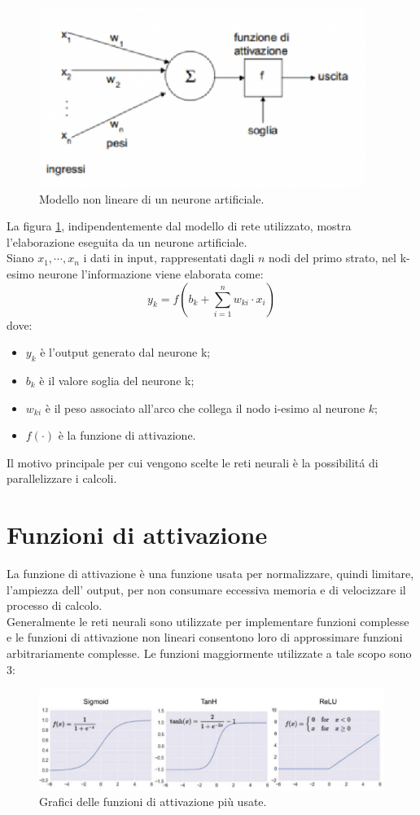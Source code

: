 \documentclass[a4paper,12pt]{report}
\begin{document}
\begin{figure}[!h]
\centering
\includegraphics[scale=1.8]{reteneurale.eps}
\caption{Modello non lineare di un neurone artificiale.}
\label{neurone}
\end{figure}

La figura \ref{neurone}, indipendentemente dal modello di rete utilizzato, mostra l'elaborazione eseguita da un neurone artificiale.\\
Siano $x_1,\cdots,x_n$ i dati in input, rappresentati dagli $n$ nodi del primo strato, nel k-esimo neurone l'informazione viene elaborata come:
$$y_k=f(b_k+\sum_{i=1}^n w_{ki}\cdot x_i)$$
dove:\\
\begin{itemize}
\item $y_k$ \`e l'output generato dal neurone k;
\item $b_k$ \`e il valore soglia del neurone k;
\item $w_{ki}$ \`e il peso associato all'arco che collega il nodo i-esimo al neurone $k$;
\item $f(\cdot)$ \`e la funzione di attivazione.
\end{itemize}
Il motivo principale per cui vengono scelte le reti neurali \`e la possibilit\'{a} di parallelizzare i calcoli.
\newpage
\section{Funzioni di attivazione}
La funzione di attivazione \`e una funzione usata per normalizzare, quindi limitare, l'ampiezza dell' output, per non consumare eccessiva memoria e di velocizzare il processo di calcolo.\\
Generalmente le reti neurali sono utilizzate per implementare funzioni complesse e le funzioni di attivazione non lineari consentono loro di approssimare funzioni arbitrariamente complesse. Le funzioni maggiormente utilizzate a tale scopo sono 3:
\begin{figure}[!h]
\includegraphics[scale=0.7]{funzioniAttivazione}
\caption{Grafici delle funzioni di attivazione pi\`{u} usate.}
\end{figure}
\end{document}
